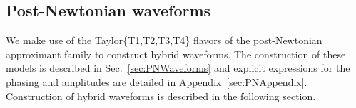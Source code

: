 \subsection{Post-Newtonian waveforms}\label{s2:PNwaveforms}

We make use of the Taylor\{T1,T2,T3,T4\} flavors of the post-Newtonian 
approximant family to construct hybrid waveforms. 
The construction of these models is described in 
Sec.~\ref{sec:PNWaveforms} and explicit expressions for the phasing and 
amplitudes are detailed in Appendix~\ref{sec:PNAppendix}. 
Construction of hybrid waveforms is described in the following section.

